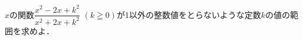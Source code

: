 \documentclass[../../main.tex]{subfiles}
\begin{document}
$x$の関数$\displaystyle\dfrac{x^2-2x+k^2}{x^2+2x+k^2}$ $(k \geqq 0)$が1以外の整数値をとらないような定数$k$の値の範囲を求めよ．
\end{document}
